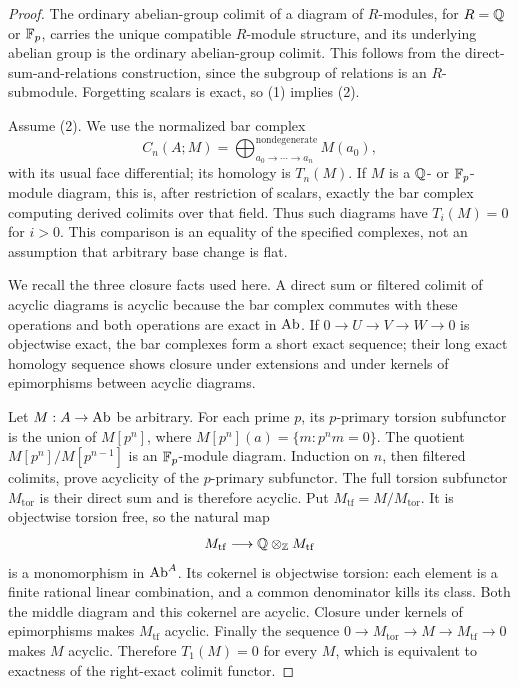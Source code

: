 \begin{proof}
The ordinary abelian-group colimit of a diagram of $R$-modules, for
$R=\mathbb Q$ or $\mathbb F_p$, carries the unique compatible $R$-module structure,
and its underlying abelian group is the ordinary abelian-group colimit.
This follows from the direct-sum-and-relations construction, since the
subgroup of relations is an $R$-submodule. Forgetting scalars is exact,
so (1) implies (2).

Assume (2). We use the normalized bar complex
\[
 C_n(A;M)=\bigoplus_{a_0\to\cdots\to a_n}^{\mathrm{nondegenerate}}
 M(a_0),
\]
with its usual face differential; its homology is $T_n(M)$. If $M$ is
a $\mathbb Q$- or $\mathbb F_p$-module diagram, this is, after restriction of scalars,
exactly the bar complex computing derived colimits over that field.
Thus such diagrams have $T_i(M)=0$ for $i>0$. This comparison is an
equality of the specified complexes, not an assumption that arbitrary
base change is flat.

We recall the three closure facts used here. A direct sum or filtered
colimit of acyclic diagrams is acyclic because the bar complex commutes
with these operations and both operations are exact in $\mathrm{Ab}$. If
$0\to U\to V\to W\to0$ is objectwise exact, the bar complexes form a
short exact sequence; their long exact homology sequence shows closure
under extensions and under kernels of epimorphisms between acyclic
diagrams.

Let $M:A\to\mathrm{Ab}$ be arbitrary. For each prime $p$, its $p$-primary
torsion subfunctor is the union of $M[p^n]$, where
$M[p^n](a)=\{m:p^nm=0\}$. The quotient
$M[p^n]/M[p^{n-1}]$ is an $\mathbb F_p$-module diagram. Induction on $n$,
then filtered colimits, prove acyclicity of the $p$-primary subfunctor.
The full torsion subfunctor $M_{\mathrm{tor}}$ is their direct sum and
is therefore acyclic. Put $M_{\mathrm{tf}}=M/M_{\mathrm{tor}}$.
It is objectwise torsion free, so the natural map
\[
 M_{\mathrm{tf}}\longrightarrow\mathbb Q\otimes_\mathbb Z M_{\mathrm{tf}}
\]
is a monomorphism in $\mathrm{Ab}^A$. Its cokernel is objectwise torsion:
each element is a finite rational linear combination, and a common
denominator kills its class. Both the middle diagram and this cokernel
are acyclic. Closure under kernels of epimorphisms makes
$M_{\mathrm{tf}}$ acyclic. Finally the sequence
$0\to M_{\mathrm{tor}}\to M\to M_{\mathrm{tf}}\to0$ makes $M$
acyclic. Therefore $T_1(M)=0$ for every $M$, which is equivalent to
exactness of the right-exact colimit functor.
\end{proof}

